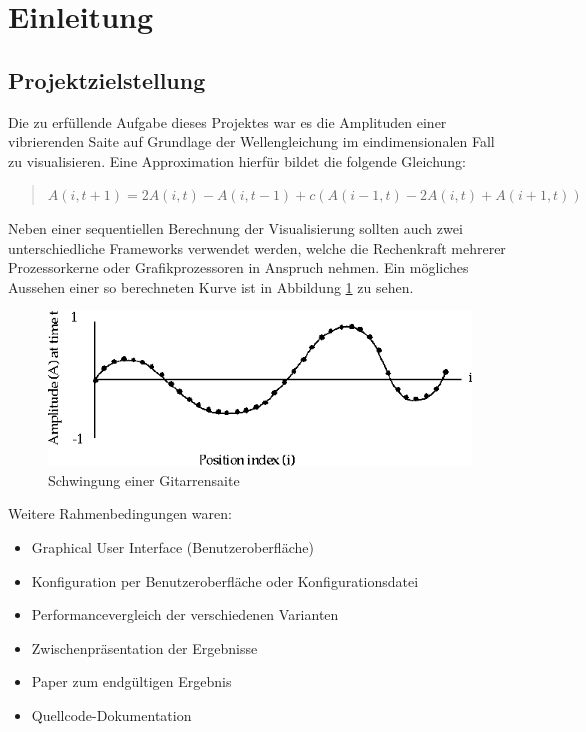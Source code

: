 
\section{Einleitung}
\subsection{Projektzielstellung}
Die zu erfüllende Aufgabe dieses Projektes war es die Amplituden einer vibrierenden Saite auf Grundlage der Wellengleichung im eindimensionalen Fall zu visualisieren. Eine Approximation hierfür bildet die folgende Gleichung:
\begin{quote}
	$A(i, t + 1) = 2A(i, t) - A(i, t - 1) + c(A(i - 1, t) - 2A(i, t) + A(i + 1, t))$
\end{quote}

Neben einer sequentiellen Berechnung der Visualisierung sollten auch zwei unterschiedliche Frameworks verwendet werden, welche die Rechenkraft mehrerer Prozessorkerne oder Grafikprozessoren in Anspruch nehmen. Ein mögliches Aussehen einer so berechneten Kurve ist in Abbildung \ref{fig:example_wave} zu sehen.\\
\begin{figure}[H]
	\centering
	\includegraphics[width=1\textwidth]{pictures/wellengleichung_aufgabe}
	\caption{Schwingung einer Gitarrensaite}
	\label{fig:example_wave}
\end{figure}

Weitere Rahmenbedingungen waren:
\begin{itemize}
	\item Graphical User Interface (Benutzeroberfläche)
	\item Konfiguration per Benutzeroberfläche oder Konfigurationsdatei
	\item Performancevergleich der verschiedenen Varianten
	\item Zwischenpräsentation der Ergebnisse
	\item Paper zum endgültigen Ergebnis
	\item Quellcode-Dokumentation
\end{itemize}

